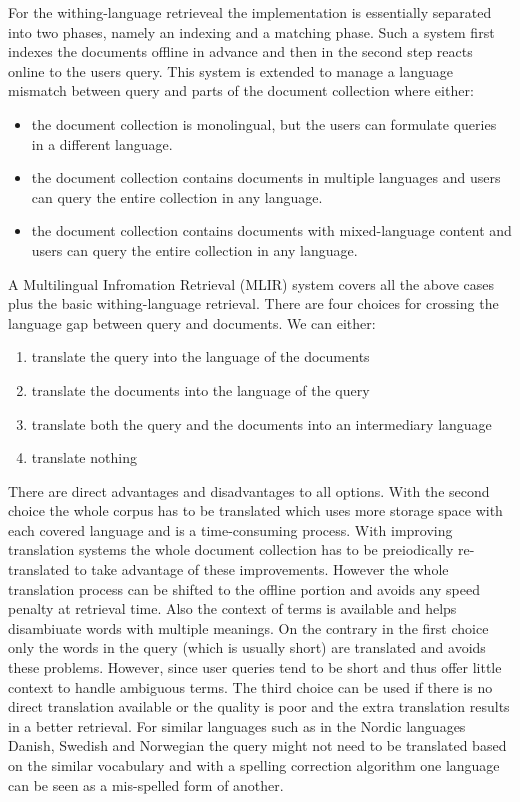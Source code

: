 \documentclass[journal]{IEEEtran}
\begin{document}
For the withing-language retrieveal the implementation is essentially separated into two phases, namely an indexing and a matching phase. Such a system first indexes the documents offline in advance and then in the second step reacts online to the users query. This system is extended to manage a language mismatch between query and parts of the document collection where either:
\begin{itemize}
	\item the document collection is monolingual, but the users can formulate queries in a different language.
	\item the document collection contains documents in multiple languages and users can query the entire collection in any language.
	\item the document collection contains documents with mixed-language content and users can query the entire collection in any language.
\end{itemize}
A Multilingual Infromation Retrieval (MLIR) system covers all the above cases plus the basic withing-language retrieval. There are four choices for crossing the language gap between query and documents. We can either:
\begin{enumerate}
	\item translate the query into the language of the documents
	\item translate the documents into the language of the query
	\item translate both the query and the documents into an intermediary language
	\item translate nothing
\end{enumerate}
There are direct advantages and disadvantages to all options. With the second choice the whole corpus has to be translated which uses more storage space with each covered language and is a time-consuming process. With improving translation systems the whole document collection has to be preiodically re-translated to take advantage of these improvements. However the whole translation process can be shifted to the offline portion and avoids any speed penalty at retrieval time. Also the context of terms is available and helps disambiuate words with multiple meanings. On the contrary in the first choice only the words in the query (which is usually short) are translated and avoids these problems. However, since user queries tend to be short and thus offer little context to handle ambiguous terms. The third choice can be used if there is no direct translation available or the quality is poor and the extra translation results in a better retrieval. For similar languages such as in the Nordic languages Danish, Swedish and Norwegian the query might not need to be translated based on the similar vocabulary and with a spelling correction algorithm one language can be seen as a mis-spelled form of another.
\end{document}
